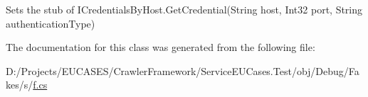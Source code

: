 Sets the stub of I\-Credentials\-By\-Host.\-Get\-Credential(\-String host, Int32 port, String authentication\-Type)



The documentation for this class was generated from the following file\-:\begin{DoxyCompactItemize}
\item 
D\-:/\-Projects/\-E\-U\-C\-A\-S\-E\-S/\-Crawler\-Framework/\-Service\-E\-U\-Cases.\-Test/obj/\-Debug/\-Fakes/s/\hyperlink{s_2f_8cs}{f.\-cs}\end{DoxyCompactItemize}
